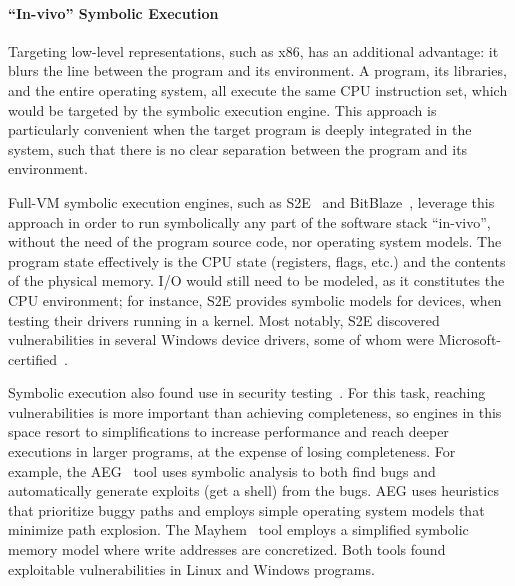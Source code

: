 \paragraph{``In-vivo'' Symbolic Execution}

Targeting low-level representations, such as x86, has an additional advantage: it blurs the line between the program and its environment.  A program, its libraries, and the entire operating system, all execute the same CPU instruction set, which would be targeted by the symbolic execution engine.
%
This approach is particularly convenient when the target program is deeply integrated in the system, such that there is no clear separation between the program and its environment.

Full-VM symbolic execution engines, such as S2E~\cite{s2eSystem} and BitBlaze~\cite{bitBlaze}, leverage this approach in order to run symbolically any part of the software stack ``in-vivo'', without the need of the program source code, nor operating system models.
%
The program state effectively is the CPU state (registers, flags, etc.) and the contents of the physical memory.
%
I/O would still need to be modeled, as it constitutes the CPU environment; for instance, S2E provides symbolic models for devices, when testing their drivers running in a kernel.
%
Most notably, S2E discovered vulnerabilities in several Windows device drivers, some of whom were Microsoft-certified~\cite{ddt}.

Symbolic execution also found use in security testing~\cite{aeg,mayhem,bitBlaze}.  For this task, reaching vulnerabilities is more important than achieving completeness, so engines in this space resort to simplifications to increase performance and reach deeper executions in larger programs, at the expense of losing completeness.
%
For example, the AEG~\cite{aeg} tool uses symbolic analysis to both find bugs and automatically generate exploits (get a shell) from the bugs.  AEG uses heuristics that prioritize buggy paths and employs simple operating system models that minimize path explosion.
%
The Mayhem~\cite{mayhem} tool employs a simplified symbolic memory model where write addresses are concretized.
%
Both tools found exploitable vulnerabilities in Linux and Windows programs.




